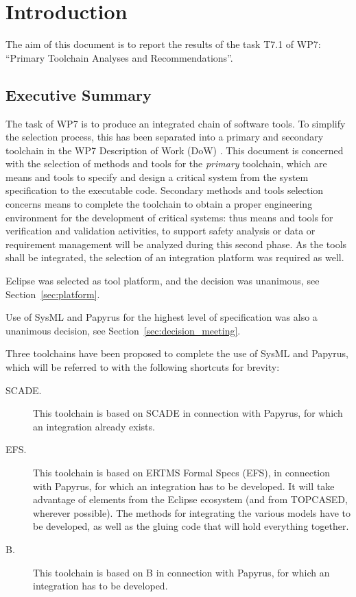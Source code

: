 

\chapter{Introduction}
\label{sec:intro}

The aim of this document is to report the results of the task T7.1 of WP7:  ``Primary Toolchain Analyses and Recommendations''.

\section{Executive Summary}

The task of WP7 is to produce an integrated chain of software tools.  To simplify the selection process, this has been separated into a primary and secondary toolchain in the WP7 Description of Work (DoW) \citep{WP7_D01}.  This document is concerned with the selection of methods and tools for the \emph{primary} toolchain, which are means and tools to specify and design a critical system from the system specification to the executable code. Secondary methods and tools selection concerns means to complete the toolchain to obtain a proper engineering environment for the development of critical systems: thus means and tools for verification and  validation activities, to support safety analysis or data or requirement management will be analyzed during this second phase.  As the tools shall be integrated, the selection of an integration platform was required as well.

Eclipse was selected as tool platform, and the decision was unanimous, see Section~\ref{sec:platform}.

Use of SysML and Papyrus for the highest level of specification was also a unanimous decision, see Section~\ref{sec:decision_meeting}. 

Three toolchains have been proposed to complete the use of SysML and Papyrus, which will be referred to with the following shortcuts for brevity:

\begin{description}
\item[SCADE.] This toolchain is based on SCADE in connection with Papyrus, for which an integration already exists.

\item[EFS.] This toolchain is based on ERTMS Formal Specs (EFS), in connection with Papyrus, for which an integration has to be developed.  It will take advantage of elements from the Eclipse ecosystem (and from TOPCASED, wherever possible).  The methods for integrating the various models have to be developed, as well as the gluing code that will hold everything together.

\item[B.] This toolchain is based on B in connection with Papyrus, for which an integration has to be developed.

\end{description}

